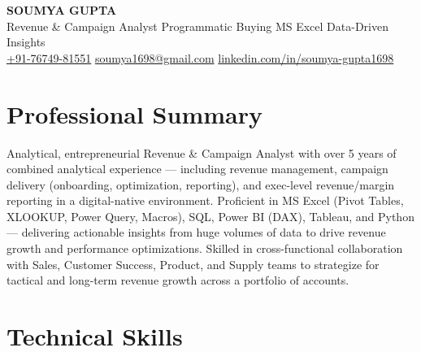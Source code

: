 \documentclass[10pt, letterpaper]{article}
\begin{document}

\begin{center}
  {\LARGE\bfseries SOUMYA GUPTA}\\[2pt]
  {\small\color{muted}Revenue \& Campaign Analyst \textbar{} Programmatic Buying \textbar{} MS Excel \textbar{} Data-Driven Insights}\\[3pt]
  {\small
  \href{tel:+917674981551}{+91-76749-81551}\enspace\textbullet\enspace
  \href{mailto:soumya1698@gmail.com}{soumya1698@gmail.com}\enspace\textbullet\enspace
  \href{https://linkedin.com/in/soumya-gupta1698}{linkedin.com/in/soumya-gupta1698}}
\end{center}

\vspace{-2pt}

\section{Professional Summary}

Analytical, entrepreneurial Revenue \& Campaign Analyst with over 5 years of combined analytical experience — including revenue management, campaign delivery (onboarding, optimization, reporting), and exec-level revenue/margin reporting in a digital-native environment. Proficient in MS Excel (Pivot Tables, XLOOKUP, Power Query, Macros), SQL, Power BI (DAX), Tableau, and Python — delivering actionable insights from huge volumes of data to drive revenue growth and performance optimizations. Skilled in cross-functional collaboration with Sales, Customer Success, Product, and Supply teams to strategize for tactical and long-term revenue growth across a portfolio of accounts.

\section{Technical Skills}
\end{document}
